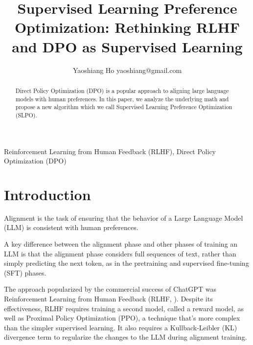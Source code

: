 \documentclass[twoside,11pt]{article}
\begin{document}
\title{Supervised Learning Preference Optimization: Rethinking RLHF and DPO as Supervised Learning}

\author{\name Yaoshiang Ho \email yaoshiang@gmail.com \\
      }

\editor{}

\maketitle 

\begin{abstract}%
Direct Policy Optimization (DPO) is a popular approach to aligning 
large language models with human preferences. 
In this paper, we analyze the underlying math and 
propose a new algorithm
which we call Supervised Learning Preference Optimization (SLPO). 
 
\end{abstract}

\begin{keywords}
  Reinforcement Learning from Human Feedback (RLHF), Direct Policy Optimization (DPO)
\end{keywords}

\section{Introduction}

Alignment is the task of ensuring that the behavior of a
Large Language Model (LLM) is consistent 
with human preferences. 

A key difference between the alignment phase and
other phases of training an LLM is that the alignment phase considers
full sequences of text, rather than simply predicting the next token, as
in the pretraining and supervised fine-tuning (SFT) phases. 

The approach popularized by the commercial success of ChatGPT was 
Reinforcement Learning from Human Feedback (RLHF, \cite{ouyang2022training}). 
Despite its effectiveness, RLHF requires training a second model, called
a reward model, as well as Proximal Policy Optimization (PPO), a 
technique that's more complex than the simpler supervised learning. It also
requires a Kullback-Leibler (KL) divergence term to regularize the
changes to the LLM during alignment training.
\end{document}
